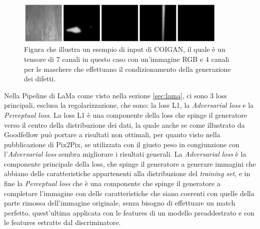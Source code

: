     \begin{figure}[H]
        \centering
        \includegraphics[width=0.9\textwidth]{imgs/Coigan/G_input.png}
        \caption{Figura che illustra un esempio di input di COIGAN, il quale è un tensore di 7 canali in questo caso con un'immagine RGB e 4 canali
        per le maschere che effettuano il condizionamento della generazione dei difetti.} 
        \label{fig:Coigan input}
    \end{figure}

Nella Pipeline di LaMa come visto nella sezione \ref{sec:lama}, ci sono 3 loss principali, esclusa la regolarizzazione, che sono:
la loss L1, la \textit{Adversarial loss} e la \textit{Perceptual loss}. La loss L1 è una componente della loss che spinge il generatore verso
il centro della distribuzione dei dati, la quale anche se come illustrato da Goodfellow può portare a risultati non ottimali, per quanto visto
nella pubblicazione di Pix2Pix, se utilizzata con il giusto peso in congiunzione con l'\textit{Adversarial loss} sembra migliorare i risultati generali.
La \textit{Adversarial loss} è la componente principale della loss, che spinge il generatore a generare immagini che abbiano delle caratteristiche
appartenenti alla distribuzione del \textit{training set}, e in fine la \textit{Perceptual loss} che è una componente che spinge
il generatore a completare l'immagine con delle caratteristiche che siano coerenti con quelle della parte rimossa dell'immagine originale, senza bisogno di effettuare
un match perfetto, quest'ultima applicata con le features di un modello preaddestrato e con le features estratte dal discriminatore.

